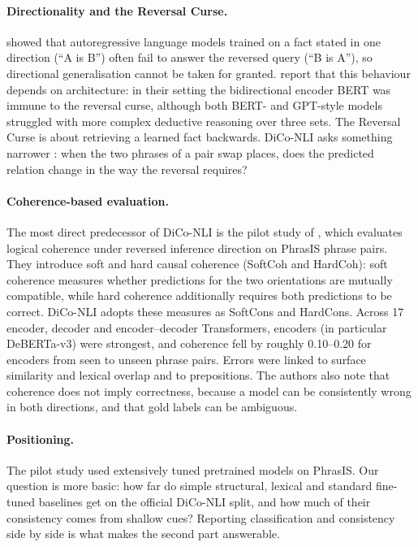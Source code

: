\documentclass[11pt,a4paper]{article}
\begin{document}
\paragraph{Directionality and the Reversal Curse.}
\citet{berglund2024reversal} showed that autoregressive language models trained on a fact stated in one direction (``A is B'') often fail to answer the reversed query (``B is A''), so directional generalisation cannot be taken for granted. \citet{wu2024reversal} report that this behaviour depends on architecture: in their setting the bidirectional encoder BERT was immune to the reversal curse, although both BERT- and GPT-style models struggled with more complex deductive reasoning over three sets. The Reversal Curse is about retrieving a learned fact backwards. DiCo-NLI asks something narrower \citep{diconli2026}: when the two phrases of a pair swap places, does the predicted relation change in the way the reversal requires?

\paragraph{Coherence-based evaluation.}
The most direct predecessor of DiCo-NLI is the pilot study of \citet{apaolaza2026assessing}, which evaluates logical coherence under reversed inference direction on PhrasIS phrase pairs. They introduce soft and hard causal coherence (SoftCoh and HardCoh): soft coherence measures whether predictions for the two orientations are mutually compatible, while hard coherence additionally requires both predictions to be correct. DiCo-NLI adopts these measures as SoftCons and HardCons. Across 17 encoder, decoder and encoder--decoder Transformers, encoders (in particular DeBERTa-v3) were strongest, and coherence fell by roughly 0.10--0.20 for encoders from seen to unseen phrase pairs. Errors were linked to surface similarity and lexical overlap and to prepositions. The authors also note that coherence does not imply correctness, because a model can be consistently wrong in both directions, and that gold labels can be ambiguous.

\paragraph{Positioning.}
The pilot study used extensively tuned pretrained models on PhrasIS. Our question is more basic: how far do simple structural, lexical and standard fine-tuned baselines get on the official DiCo-NLI split, and how much of their consistency comes from shallow cues? Reporting classification and consistency side by side is what makes the second part answerable.
\end{document}
